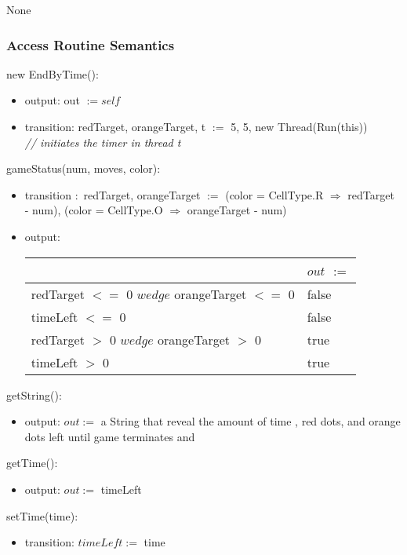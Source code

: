 \documentclass[12pt]{article}
\begin{document}
None

\subsubsection* {Access Routine Semantics}

new EndByTime():

\begin{itemize}
  \item output: out $:= \mathit{self}$
  \item transition: redTarget, orangeTarget, t $:=$ 5, 5, new Thread(Run(this)) \\ \textit{// initiates the timer in thread t}
\end{itemize}

\noindent gameStatus(num, moves, color):

\begin{itemize}
  \item transition $:$
        redTarget, orangeTarget $:=$ (color = CellType.R $\Rightarrow$ redTarget - num), (color = CellType.O $\Rightarrow$ orangeTarget - num)
  \item output:
  \medskip
  \begin{tabular}{| l | l |}
  \hline
  ~ & $out$ $:=$ \\
  \hline
  redTarget $<=$ 0 $wedge$ orangeTarget $<=$ 0 & false \\
  \hline
  timeLeft $<=$ 0 & false \\
  \hline
  redTarget $>$ 0 $wedge$ orangeTarget $>$ 0 & true \\
  \hline
  timeLeft $>$ 0 & true \\
  \hline
  \end{tabular}
\end{itemize}

\noindent getString():
\begin{itemize}
  \item output: $out :=$ a String that reveal the amount of time , red dots, and orange dots left until game terminates and
\end{itemize}

\noindent getTime():
\begin{itemize}
  \item output: $out :=$ timeLeft
\end{itemize}

\noindent setTime(time):
\begin{itemize}
  \item transition: $timeLeft :=$ time
\end{itemize}
\end{document}
